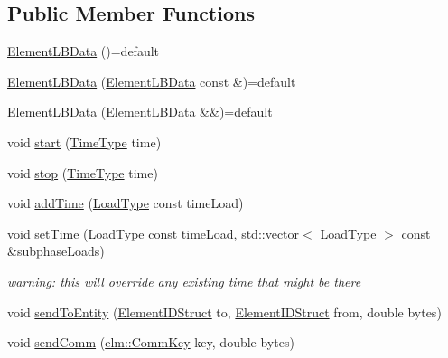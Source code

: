 \subsection*{Public Member Functions}
\begin{DoxyCompactItemize}
\item 
\hyperlink{structvt_1_1elm_1_1_element_l_b_data_aa7a5f68f276e0d3ae1279bb0f3050e4d}{Element\+L\+B\+Data} ()=default
\item 
\hyperlink{structvt_1_1elm_1_1_element_l_b_data_a2aa0d177c123d04ac24342b9558f3c46}{Element\+L\+B\+Data} (\hyperlink{structvt_1_1elm_1_1_element_l_b_data}{Element\+L\+B\+Data} const \&)=default
\item 
\hyperlink{structvt_1_1elm_1_1_element_l_b_data_a8ab77d61c0c9351e21329445e7a7b844}{Element\+L\+B\+Data} (\hyperlink{structvt_1_1elm_1_1_element_l_b_data}{Element\+L\+B\+Data} \&\&)=default
\item 
void \hyperlink{structvt_1_1elm_1_1_element_l_b_data_a19e990ccbc5b1090e8d8385e19af760a}{start} (\hyperlink{namespacevt_a2b9f28078dc309ad0706b69ded743e69}{Time\+Type} time)
\item 
void \hyperlink{structvt_1_1elm_1_1_element_l_b_data_a96ccd1c4f6ec13365ca9d483eab8944c}{stop} (\hyperlink{namespacevt_a2b9f28078dc309ad0706b69ded743e69}{Time\+Type} time)
\item 
void \hyperlink{structvt_1_1elm_1_1_element_l_b_data_ada678fdc6f4b80c29bbe0f1c973a13e3}{add\+Time} (\hyperlink{namespacevt_a8fb51741340b87d7aaee0bef60e9896b}{Load\+Type} const time\+Load)
\item 
void \hyperlink{structvt_1_1elm_1_1_element_l_b_data_a144c7d6efa4c672a450aa9de612f3bff}{set\+Time} (\hyperlink{namespacevt_a8fb51741340b87d7aaee0bef60e9896b}{Load\+Type} const time\+Load, std\+::vector$<$ \hyperlink{namespacevt_a8fb51741340b87d7aaee0bef60e9896b}{Load\+Type} $>$ const \&subphase\+Loads)
\begin{DoxyCompactList}\small\item\em warning\+: this will override any existing time that might be there \end{DoxyCompactList}\item 
void \hyperlink{structvt_1_1elm_1_1_element_l_b_data_aa4d5faecce53f1ad3d4565a4e7b1cd10}{send\+To\+Entity} (\hyperlink{structvt_1_1elm_1_1_element_i_d_struct}{Element\+I\+D\+Struct} to, \hyperlink{structvt_1_1elm_1_1_element_i_d_struct}{Element\+I\+D\+Struct} from, double bytes)
\item 
void \hyperlink{structvt_1_1elm_1_1_element_l_b_data_ab7360fde34acf4dafafc8335617d8b6b}{send\+Comm} (\hyperlink{structvt_1_1elm_1_1_comm_key}{elm\+::\+Comm\+Key} key, double bytes)

\end{DoxyCompactItemize}
